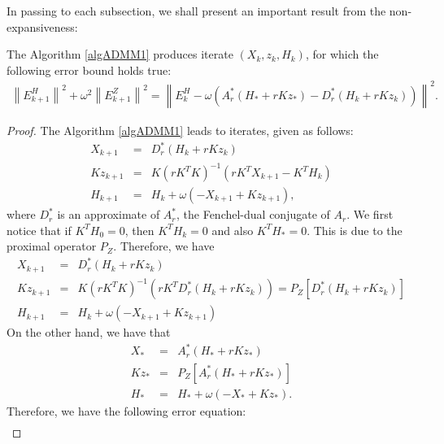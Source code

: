 In passing to each subsection, we shall present an important result from the non-expansiveness: 
\begin{lemma}\label{main:lem1} 
The Algorithm \ref{algADMM1} produces iterate $(X_k, z_k, H_k)$, for which the following error bound holds true: 
\begin{eqnarray*}
\left \|E_{k+1}^H \right \|^2 + \omega^2 \left \|E_{k+1}^Z \right \|^2 = \left \|E_k^H - \omega (A_r^{*} (H_* + r K z_*) - D_r^{*} (H_k + r K z_k)) \right \|^2. 
\end{eqnarray*}
\end{lemma}
\begin{proof} 
The Algorithm \ref{algADMM1} leads to iterates, given as follows: 
\begin{eqnarray*}
X_{k+1} &=& D_r^* (H_k + r K z_k) \\
Kz_{k+1} &=& K(rK^TK)^{-1} (rK^T X_{k+1} - K^TH_k) \\ 
H_{k+1} &=& H_k + \omega (-X_{k+1} + Kz_{k+1} ), 
\end{eqnarray*}
where $D_r^*$ is an approximate of $A_r^*$, the Fenchel-dual conjugate of $A_r$. We first notice that if $K^TH_0 = 0$, then $K^TH_k = 0$ and also $K^TH_* = 0$. This is due to the proximal operator $P_Z$. Therefore, we have 
\begin{eqnarray*}
X_{k+1} &=& D_r^{*} (H_k + r K z_k) \\
Kz_{k+1} &=& K(rK^TK)^{-1} (rK^T D_r^* (H_k + r K z_k)) = P_Z [D_r^* (H_k + r K z_k)]  \\ 
H_{k+1} &=& H_k + \omega (-X_{k+1} + Kz_{k+1} )
\end{eqnarray*}
On the other hand, we have that 
\begin{eqnarray*}
X_{*} &=& A_r^{*} (H_* + r K z_*) \\
Kz_{*} &=& P_Z [A_r^{*}(H_* + rK z_*)] \\ 
H_{*} &=& H_* + \omega (-X_{*} + K z_{*}). 
\end{eqnarray*}
Therefore, we have the following error equation: 
\begin{eqnarray*}

\end{eqnarray*}
\end{proof}
